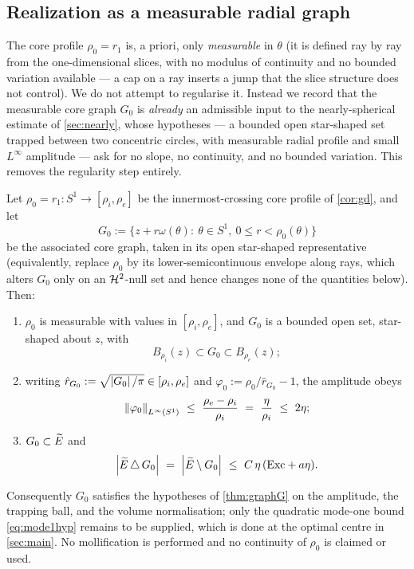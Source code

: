 \subsection{Realization as a measurable radial graph}

The core profile $\rho_0=r_1$ is, a priori, only \emph{measurable} in
$\theta$ (it is defined ray by ray from the one-dimensional slices, with no
modulus of continuity and no bounded variation available --- a cap on a ray
inserts a jump that the slice structure does not control). We do not attempt
to regularise it. Instead we record that the measurable core graph $G_0$ is
\emph{already} an admissible input to the nearly-spherical estimate of
\cref{sec:nearly}, whose hypotheses --- a bounded open star-shaped set
trapped between two concentric circles, with measurable radial profile and
small $L^\infty$ amplitude --- ask for no slope, no continuity, and no
bounded variation. This removes the regularity step entirely.

\begin{proposition}\label{prop:realization}
Let $\rho_0=r_1\colon S^1\to[\rho_i,\rho_e]$ be the innermost-crossing core
profile of \cref{cor:gd}, and let
\[
   G_0:=\{z+r\omega(\theta):\ \theta\in S^1,\ 0\le r<\rho_0(\theta)\}
\]
be the associated core graph, taken in its open star-shaped representative
\textup{(}equivalently, replace $\rho_0$ by its lower-semicontinuous
envelope along rays, which alters $G_0$ only on an $\mathcal{H}^2$-null set and hence
changes none of the quantities below\textup{)}. Then:
\begin{enumerate}[label=\textup{(\roman*)},leftmargin=2.4em]
\item\label{it:real-meas} $\rho_0$ is measurable with values in
$[\rho_i,\rho_e]$, and $G_0$ is a bounded open set, star-shaped about $z$,
with
\begin{equation}\label{eq:real-trap}
   B_{\rho_i}(z)\subset G_0\subset B_{\rho_e}(z);
\end{equation}
\item\label{it:real-amp} writing $\hat r_{G_0}:=\sqrt{\left\lvert G_0\right\rvert/\pi}\in
[\rho_i,\rho_e]$ and $\varphi_0:=\rho_0/\hat r_{G_0}-1$, the amplitude obeys
\begin{equation}\label{eq:realization}
   \left\lVert\varphi_0\right\rVert_{L^\infty(S^1)}\ \le\ \frac{\rho_e-\rho_i}{\rho_i}
   \ =\ \frac{\eta}{\rho_i}\ \le\ 2\eta;
\end{equation}
\item\label{it:real-close} $G_0\subset\widetilde{E}$ and
\begin{equation}\label{eq:realization-close}
   \left\lvert\widetilde{E}\,\triangle\,G_0\right\rvert\ =\ \left\lvert\widetilde{E}\setminus G_0\right\rvert
   \ \le\ C\,\eta\,(\mathrm{Exc}+a\eta).
\end{equation}
\end{enumerate}
Consequently $G_0$ satisfies the hypotheses of \cref{thm:graphG} on the
amplitude, the trapping ball, and the volume normalisation; only the
quadratic mode-one bound \eqref{eq:mode1hyp} remains to be supplied, which is
done at the optimal centre in \cref{sec:main}. No mollification is performed
and no continuity of $\rho_0$ is claimed or used.
\end{proposition}

